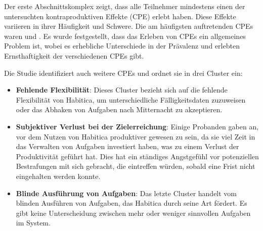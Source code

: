 \documentclass[sigconf, nonacm]{acmart}
\begin{document}
Der erste Abschnittskomplex zeigt, dass alle Teilnehmer mindestens einen der untersuchten kontraproduktiven Effekte (CPE) erlebt haben. Diese Effekte variieren in ihrer Häufigkeit und Schwere. Die am häufigsten auftretenden CPEs waren   und . Es wurde festgestellt, dass das Erleben von CPEs ein allgemeines Problem ist, wobei es erhebliche Unterschiede in der Prävalenz und erlebten Ernsthaftigkeit der verschiedenen CPEs gibt.

Die Studie identifiziert auch weitere CPEs und ordnet sie in drei Cluster ein:
\begin{itemize}
	\item \textbf{Fehlende Flexibilität}: Dieses Cluster bezieht sich auf die fehlende Flexibilität von Habitica, um unterschiedliche Fälligkeitsdaten zuzuweisen oder das Abhaken von Aufgaben nach Mitternacht zu akzeptieren.
	\item \textbf{Subjektiver Verlust bei der Zielerreichung}: Einige Probanden gaben an, vor dem Nutzen von Habitica produktiver gewesen zu sein, da sie viel Zeit in das Verwalten von Aufgaben investiert haben, was zu einem Verlust der Produktivität geführt hat. Dies hat ein ständiges Angstgefühl vor potenziellen Bestrafungen mit sich gebracht, die eintreffen würden, sobald eine Frist nicht eingehalten werden konnte.
	\item \textbf{Blinde Ausführung von Aufgaben}: Das letzte Cluster handelt vom blinden Ausführen von Aufgaben, das Habitica durch seine Art fördert. Es gibt keine Unterscheidung zwischen mehr oder weniger sinnvollen Aufgaben im System.
\end{itemize}
\end{document}
